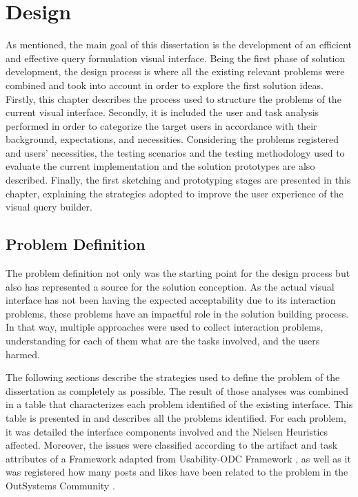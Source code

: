 \chapter{Design}
\label{cha:design}

As mentioned, the main goal of this dissertation is the development of an efficient and effective query formulation visual interface. Being the first phase of solution development, the design process is where all the existing relevant problems were combined and took into account in order to explore the first solution ideas. Firstly, this chapter describes the process used to structure the problems of the current visual interface. Secondly, it is included the user and task analysis performed in order to categorize the target users in accordance with their background, expectations, and necessities. Considering the problems registered and users' necessities, the testing scenarios and the testing methodology used to evaluate the current implementation and the solution prototypes are also described. Finally, the first sketching and prototyping stages are presented in this chapter, explaining the strategies adopted to improve the user experience of the visual query builder.

\section{Problem Definition}
\label{sec:problem_definition}

The problem definition not only was the starting point for the design process but also has represented a source for the solution conception. As the actual visual interface has not been having the expected acceptability due to its interaction problems, these problems have an impactful role in the solution building process. In that way, multiple approaches were used to collect interaction problems, understanding for each of them what are the tasks involved, and the users harmed.

The following sections describe the strategies used to define the problem of the dissertation as completely as possible. The result of those analyses was combined in a table that characterizes each problem identified of the existing interface. This table is presented in  and describes all the problems identified. For each problem, it was detailed the interface components involved and the Nielsen Heuristics \cite{nielsen_heuristics} affected. Moreover, the issues were classified according to the artifact and task attributes of a Framework adapted from Usability-ODC Framework \cite{in_process_usability_problem_classification_analysis_improvement}, as well as it was registered how many posts and likes have been related to the problem in the OutSystems Community \cite{outsystems_community}.

